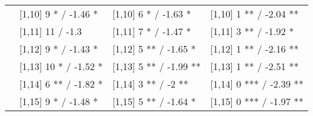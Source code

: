 \begin{table}
\begin{tabular}[t]{llll}
 & {}[1,10] 9 * / -1.46 * & {}[1,10] 6 * / -1.63 * & {}[1,10] 1 ** / -2.04 **\\
 & {}[1,11] 11  / -1.3 & {}[1,11] 7 * / -1.47 * & {}[1,11] 3 ** / -1.92 *\\
 & {}[1,12] 9 * / -1.43 * & {}[1,12] 5 ** / -1.65 * & {}[1,12] 1 ** / -2.16 **\\
\addlinespace
 & {}[1,13] 10 * / -1.52 * & {}[1,13] 5 ** / -1.99 ** & {}[1,13] 1 ** / -2.51 **\\
 & {}[1,14] 6 ** / -1.82 * & {}[1,14] 3 ** / -2 ** & {}[1,14] 0 *** / -2.39 **\\
 & {}[1,15] 9 * / -1.48 * & {}[1,15] 5 ** / -1.64 * & {}[1,15] 0 *** / -1.97 **\\
\bottomrule
\end{tabular}
\end{table}
